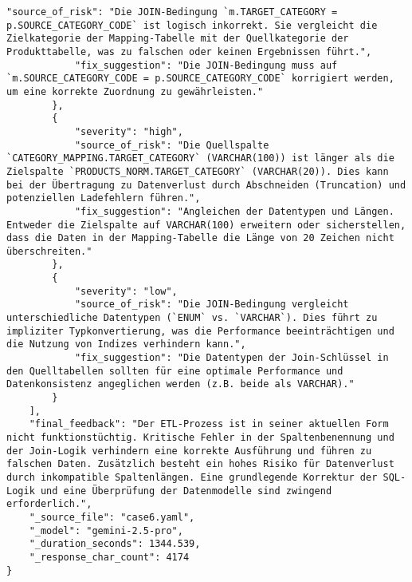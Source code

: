 \begin{lstlisting}[caption={Ausgabe: GEMINI 2.5 Pro Anwendungsfall 6 Hauptdurchlauf},label={gemini_case6_prompt1}]
            "source_of_risk": "Die JOIN-Bedingung `m.TARGET_CATEGORY = p.SOURCE_CATEGORY_CODE` ist logisch inkorrekt. Sie vergleicht die Zielkategorie der Mapping-Tabelle mit der Quellkategorie der Produkttabelle, was zu falschen oder keinen Ergebnissen führt.",
            "fix_suggestion": "Die JOIN-Bedingung muss auf `m.SOURCE_CATEGORY_CODE = p.SOURCE_CATEGORY_CODE` korrigiert werden, um eine korrekte Zuordnung zu gewährleisten."
        },
        {
            "severity": "high",
            "source_of_risk": "Die Quellspalte `CATEGORY_MAPPING.TARGET_CATEGORY` (VARCHAR(100)) ist länger als die Zielspalte `PRODUCTS_NORM.TARGET_CATEGORY` (VARCHAR(20)). Dies kann bei der Übertragung zu Datenverlust durch Abschneiden (Truncation) und potenziellen Ladefehlern führen.",
            "fix_suggestion": "Angleichen der Datentypen und Längen. Entweder die Zielspalte auf VARCHAR(100) erweitern oder sicherstellen, dass die Daten in der Mapping-Tabelle die Länge von 20 Zeichen nicht überschreiten."
        },
        {
            "severity": "low",
            "source_of_risk": "Die JOIN-Bedingung vergleicht unterschiedliche Datentypen (`ENUM` vs. `VARCHAR`). Dies führt zu impliziter Typkonvertierung, was die Performance beeinträchtigen und die Nutzung von Indizes verhindern kann.",
            "fix_suggestion": "Die Datentypen der Join-Schlüssel in den Quelltabellen sollten für eine optimale Performance und Datenkonsistenz angeglichen werden (z.B. beide als VARCHAR)."
        }
    ],
    "final_feedback": "Der ETL-Prozess ist in seiner aktuellen Form nicht funktionstüchtig. Kritische Fehler in der Spaltenbenennung und der Join-Logik verhindern eine korrekte Ausführung und führen zu falschen Daten. Zusätzlich besteht ein hohes Risiko für Datenverlust durch inkompatible Spaltenlängen. Eine grundlegende Korrektur der SQL-Logik und eine Überprüfung der Datenmodelle sind zwingend erforderlich.",
    "_source_file": "case6.yaml",
    "_model": "gemini-2.5-pro",
    "_duration_seconds": 1344.539,
    "_response_char_count": 4174
}
\end{lstlisting}

